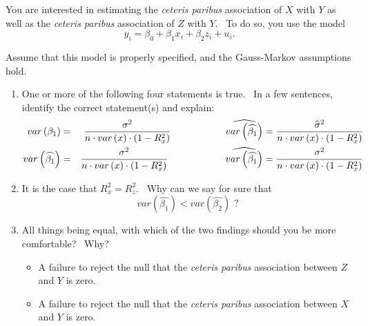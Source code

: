 \documentclass[11pt]{article}
\begin{document}
\begin{enumerate}
\bigskip

You are interested in estimating the \textit{ceteris paribus }association of 
$X$ with $Y$ as well as the \textit{ceteris paribus }association of $Z$ with 
$Y.$ \ To do so, you use the model 
\begin{equation*}
y_{i}=\beta _{0}+\beta _{1}x_{i}+\beta _{2}z_{i}+u_{i}.
\end{equation*}

Assume that this model is properly specified, and the Gauss-Markov
assumptions hold.\bigskip

\begin{enumerate}
\item One or more of the following four statements is true. \ In a few
sentences, identify the correct statement(s) and explain:%
\begin{eqnarray*}
var\left( \beta _{1}\right) &=&\frac{\sigma ^{2}}{n\cdot var\left( x\right)
\cdot \left( 1-R_{x}^{2}\right) }\text{ \ \ \ \ \ \ \ \ \ \ \ \ \ \ \ \ }%
\widehat{var\left( \widehat{\beta _{1}}\right) }=\frac{\widehat{\sigma }^{2}%
}{n\cdot var\left( x\right) \cdot \left( 1-R_{x}^{2}\right) } \\
var\left( \widehat{\beta _{1}}\right) &=&\frac{\sigma ^{2}}{n\cdot var\left(
x\right) \cdot \left( 1-R_{x}^{2}\right) }\text{ \ \ \ \ \ \ \ \ \ \ \ \ \ \
\ \ \ }\widehat{var\left( \widehat{\beta _{1}}\right) }=\frac{\sigma ^{2}}{%
n\cdot var\left( x\right) \cdot \left( 1-R_{x}^{2}\right) }
\end{eqnarray*}%
\bigskip

\item It is the case that $R_{x}^{2}=R_{z}^{2}.$ \ Why can we say for sure
that 
\begin{equation*}
var\left( \widehat{\beta _{1}}\right) <var\left( \widehat{\beta _{2}}\right) 
\text{ \ ?}
\end{equation*}%
\bigskip

\item All things being equal, with which of the two findings should you be
more comfortable? \ Why?

\begin{itemize}
\item A failure to reject the null that the \textit{ceteris paribus }%
association between $Z$ and $Y$ is zero.

\item A failure to reject the null that the \textit{ceteris paribus }%
association between $X$ and $Y$ is zero. \newpage
\end{itemize}
\end{enumerate}


\end{enumerate}
\end{document}
